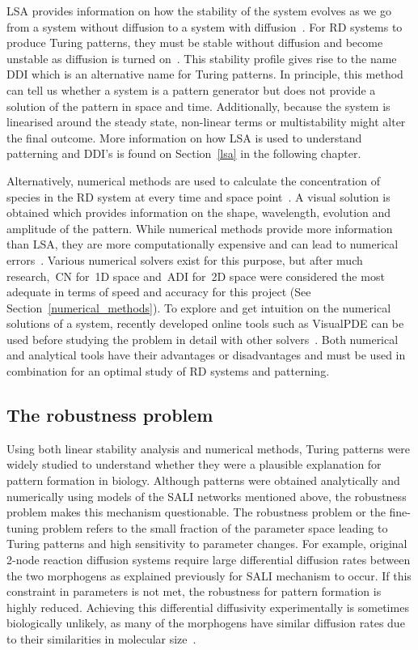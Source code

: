 LSA provides information on how the stability of the system evolves as we go from a system without diffusion to a system with diffusion~\parencite{Glendinning1994}.
For RD systems to produce Turing patterns, they must be stable without diffusion and become unstable as diffusion is turned on~\parencite{J.DMurray2002}.
This stability profile gives rise to the name \acrfull{DDI} which is an alternative name for Turing patterns.
In principle, this method can tell us whether a system is a pattern generator but does not provide a solution of the pattern in space and time. Additionally, because the system is linearised around the steady state, non-linear terms or multistability might alter the final outcome.
More information on how LSA is used to understand patterning and DDI's is found on Section~\ref{lsa} in the following chapter.

Alternatively, numerical methods are used to calculate the concentration of species in the RD system at every time and space point~\parencite{Ramos1983}.
A visual solution is obtained which provides information on the shape, wavelength, evolution and amplitude of the pattern.
While numerical methods provide more information than LSA, they are more computationally expensive and can lead to numerical errors~\parencite{J.DMurray2002}.
Various numerical solvers exist for this purpose, but after much research,~\acrfull{CN} for~\acrshort{1D} space and~\acrfull{ADI} for~\acrshort{2D} space were considered the most adequate in terms of speed and accuracy for this project (See Section~\ref{numerical_methods}).
To explore and get intuition on the numerical solutions of a system, recently developed online tools such as VisualPDE can be used before studying the problem in detail with other solvers~\parencite{Walker2023}.
Both numerical and analytical tools have their advantages or disadvantages and must be used in combination for an optimal study of RD systems and patterning.

\subsection{The robustness problem}

Using both linear stability analysis and numerical methods, Turing patterns were widely studied to understand whether they were a plausible explanation for pattern formation in biology.
Although patterns were obtained analytically and numerically using models of the SALI networks mentioned above, the robustness problem makes this mechanism questionable.
The robustness problem or the fine-tuning problem refers to the small fraction of the parameter space leading to Turing patterns and high sensitivity to parameter changes.
For example, original 2-node reaction diffusion systems require large differential diffusion rates between the two morphogens as explained previously for SALI mechanism to occur.
If this constraint in parameters is not met, the robustness for pattern formation is highly reduced.
Achieving this differential diffusivity experimentally is sometimes biologically unlikely, as many of the morphogens have similar diffusion rates due to their similarities in molecular size~\parencite{huidobro}.

